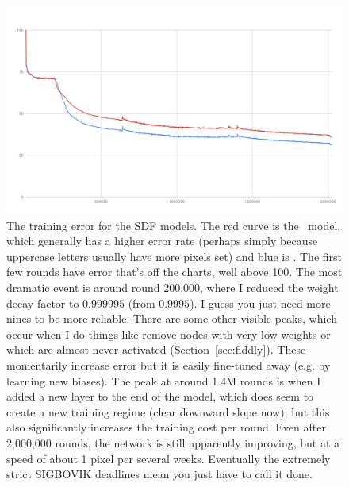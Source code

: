 \documentclass[twocolumn]{article} %
\begin{document}
\begin{figure}[ht]
\centering
  \includegraphics[width=0.99 \linewidth]{sdfmergederror}
\caption{ The training error for the SDF models. The red curve is the
  \makeuppercase\ model, which generally has a higher error rate
  (perhaps simply because uppercase letters usually have more pixels
  set) and blue is \makelowercase. The first few rounds have error
  that's off the charts, well above 100. The most dramatic event is
  around round 200,000, where I reduced the weight decay factor to
  $0.999995$ (from $0.9995$). I guess you just need more nines to be
  more reliable. There are some other visible peaks, which occur when
  I do things like remove nodes with very low weights or which are
  almost never activated (Section~\ref{sec:fiddly}). These momentarily
  increase error but it is easily fine-tuned away (e.g. by learning
  new biases). The peak at around 1.4M rounds is when I added a new
  layer to the end of the model, which does seem to create a new
  training regime (clear downward slope now); but this also
  significantly increases the training cost per round. Even after
  2,000,000 rounds, the network is still apparently improving, but at
  a speed of about 1 pixel per several weeks. Eventually the extremely
  strict SIGBOVIK deadlines mean you just have to call it done.
} \label{fig:sdfmergederror}
\end{figure}
\end{document}
